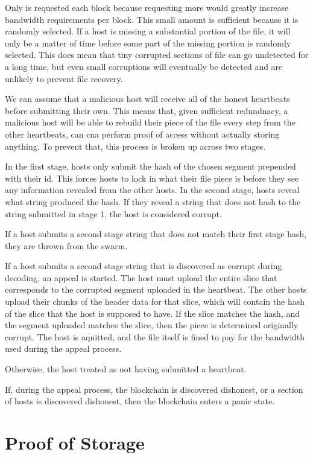 \documentclass[twocolumn]{article}
\begin{document}
Only \filechecksize{} is requested each block because requesting more would greatly increase bandwidth requirements per block.
This small amount is sufficient because it is randomly selected.
If a host is missing a substantial portion of the file, it will only be a matter of time before some part of the missing portion is randomly selected.
This does mean that tiny corrupted sections of file can go undetected for a long time, but even small corruptions will eventually be detected and are unlikely to prevent file recovery.

We can assume that a malicious host will receive all of the honest heartbeats before submitting their own.
This means that, given sufficient redundnacy, a malicious host will be able to rebuild their piece of the file every step from the other heartbeats, can cna perform proof of access without actually storing anything.
To prevent that, this process is broken up across two stages.

In the first stage, hosts only submit the hash of the chosen segment prepended with their id.
This forces hosts to lock in what their file piece is before they see any information revealed from the other hosts.
In the second stage, hosts reveal what string produced the hash.
If they reveal a string that does not hash to the string submitted in stage 1, the host is considered corrupt.

If a host submits a second stage string that does not match their first stage hash, they are thrown from the swarm.

If a host submits a second stage string that is discovered as corrupt during decoding, an appeal is started.
The host must upload the entire slice that corresponds to the corrupted segment uploaded in the heartbeat.
The other hosts upload their chunks of the header data for that slice, which will contain the hash of the slice that the host is supposed to have.
If the slice matches the hash, and the segment uploaded matches the slice, then the piece is determined originally corrupt.
The host is aquitted, and the file itself is fined to pay for the bandwidth used during the appeal process.

Otherwise, the host treated as not having submitted a heartbeat.

If, during the appeal process, the blockchain is discovered dishonest, or a section of hosts is discovered dishonest, then the blockchain enters a panic state.

\section{Proof of Storage}
\end{document}
